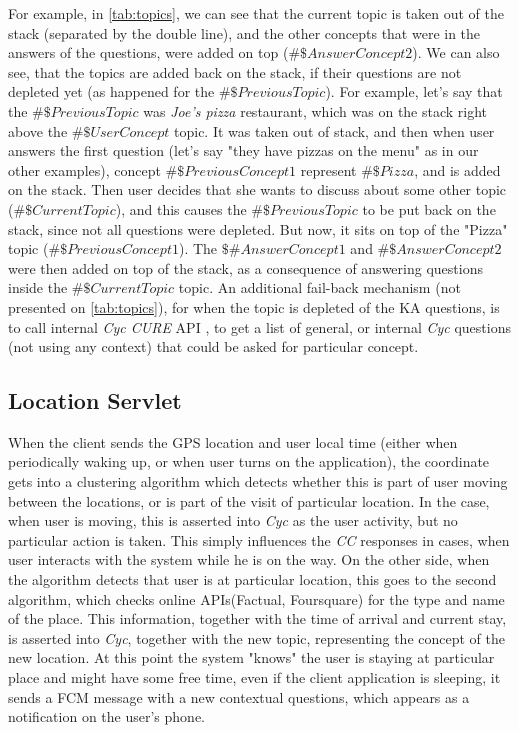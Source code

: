 For example, in \autoref{tab:topics}, we can see that the current topic is
taken out of the stack (separated by the double line), and the other concepts 
that were in the answers of the questions, were added on top 
($\#\$AnswerConcept2$). We can also see, that the topics are added back on the
stack, if their questions are not depleted yet (as happened for the 
$\#\$PreviousTopic$). For example, let's say that the $\#\$PreviousTopic$ was
\emph{Joe's pizza} restaurant, which was on the stack right above the 
$\#\$UserConcept$ topic. It was taken out of stack, and then when user answers
the first question (let's say "they have pizzas on the menu" as in our other
examples), concept $\#\$PreviousConcept1$ represent $\#\$Pizza$, and is added
on the stack. Then user decides that she wants to discuss about some other 
topic ($\#\$CurrentTopic$), and this causes the $\#\$PreviousTopic$ to be put
back on the stack, since not all questions were depleted. But now, it sits
on top of the "Pizza" topic ($\#\$PreviousConcept1$). The $\$\#AnswerConcept1$ 
and $\#\$AnswerConcept2$ were then added on top of the stack, as a consequence 
of answering questions inside the $\#\$CurrentTopic$ topic. An additional 
fail-back mechanism (not presented on \autoref{tab:topics}), for when the
topic is depleted of the KA questions, is to call internal \emph{Cyc CURE} API
\autocite{Witbrock2010}, to get a list of general, or internal \emph{Cyc} 
questions (not using any context) that could be asked for particular concept.

\subsection{Location Servlet}
\label{section:locationServlet}
When the client sends the GPS location and user local time (either when 
periodically waking up, or when user turns on the application), the coordinate
gets into a clustering algorithm which detects whether this is part of user
moving between the locations, or is part of the visit of particular location.
In the case, when user is moving, this is asserted into \emph{Cyc} as the user
activity, but no particular action is taken. This simply influences the 
\emph{CC} responses in cases, when user interacts with the system while he is
on the way. On the other side, when the algorithm detects that user is at 
particular location, this goes to the second algorithm, which checks online 
APIs(Factual, Foursquare) for the type and name of the place. This information,
together with the time of arrival and current stay, is asserted into \emph{Cyc},
together with the new topic, representing the concept of the new location. 
At this point the system "knows" the user is staying at particular place and 
might have some free time, even if the client application is sleeping, it sends
a FCM message with a new contextual questions, which appears as a notification
on the user's phone.

